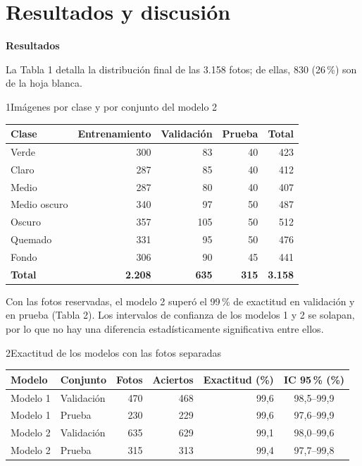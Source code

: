 \section{Resultados y discusión}
\textbf{Resultados}

La Tabla 1 detalla la distribución final de las 3.158 fotos; de ellas, 830 (26\,\%) son de la hoja blanca.

\begin{apatable}{1}{Imágenes por clase y por conjunto del modelo 2}
\begin{tabular}{@{}lrrrr@{}}
\toprule
Clase & Entrenamiento & Validación & Prueba & Total\\
\midrule
Verde & 300 & 83 & 40 & 423\\
Claro & 287 & 85 & 40 & 412\\
Medio & 287 & 80 & 40 & 407\\
Medio oscuro & 340 & 97 & 50 & 487\\
Oscuro & 357 & 105 & 50 & 512\\
Quemado & 331 & 95 & 50 & 476\\
Fondo & 306 & 90 & 45 & 441\\
\midrule
\textbf{Total} & \textbf{2.208} & \textbf{635} & \textbf{315} & \textbf{3.158}\\
\bottomrule
\end{tabular}
\end{apatable}

Con las fotos reservadas, el modelo 2 superó el 99\,\% de exactitud en validación y en prueba (Tabla 2). Los intervalos de confianza de los modelos 1 y 2 se solapan, por lo que no hay una diferencia estadísticamente significativa entre ellos.

\begin{apatable}{2}{Exactitud de los modelos con las fotos separadas}
\begin{tabular}{@{}llrrrc@{}}
\toprule
Modelo & Conjunto & Fotos & Aciertos & Exactitud (\%) & IC 95\,\% (\%)\\
\midrule
Modelo 1 & Validación & 470 & 468 & 99,6 & 98,5--99,9\\
Modelo 1 & Prueba & 230 & 229 & 99,6 & 97,6--99,9\\
Modelo 2 & Validación & 635 & 629 & 99,1 & 98,0--99,6\\
Modelo 2 & Prueba & 315 & 313 & 99,4 & 97,7--99,8\\
\bottomrule
\end{tabular}
\end{apatable}

